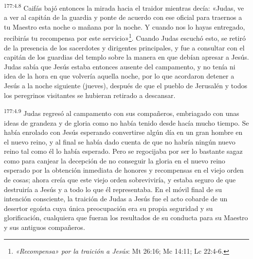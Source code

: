 \par 
\textsuperscript{177:4.8} Caifás bajó entonces la mirada hacia el traidor mientras decía: «Judas, ve a ver al capitán de la guardia y ponte de acuerdo con ese oficial para traernos a tu Maestro esta noche o mañana por la noche. Y cuando nos lo hayas entregado, recibirás tu recompensa por este servicio»\footnote{\textit{«Recompensa» por la traición a Jesús}: Mt 26:16; Mc 14:11; Lc 22:4-6.}. Cuando Judas escuchó esto, se retiró de la presencia de los sacerdotes y dirigentes principales, y fue a consultar con el capitán de los guardias del templo sobre la manera en que debían apresar a Jesús. Judas sabía que Jesús estaba entonces ausente del campamento, y no tenía ni idea de la hora en que volvería aquella noche, por lo que acordaron detener a Jesús a la noche siguiente (jueves), después de que el pueblo de Jerusalén y todos los peregrinos visitantes se hubieran retirado a descansar.

\par 
\textsuperscript{177:4.9} Judas regresó al campamento con sus compañeros, embriagado con unas ideas de grandeza y de gloria como no había tenido desde hacía mucho tiempo. Se había enrolado con Jesús esperando convertirse algún día en un gran hombre en el nuevo reino, y al final se había dado cuenta de que no habría ningún nuevo reino tal como él lo había esperado. Pero se regocijaba por ser lo bastante sagaz como para canjear la decepción de no conseguir la gloria en el nuevo reino esperado por la obtención inmediata de honores y recompensas en el viejo orden de cosas; ahora creía que este viejo orden sobreviviría, y estaba seguro de que destruiría a Jesús y a todo lo que él representaba. En el móvil final de su intención consciente, la traición de Judas a Jesús fue el acto cobarde de un desertor egoísta cuya única preocupación era su propia seguridad y su glorificación, cualquiera que fueran los resultados de su conducta para su Maestro y sus antiguos compañeros.

